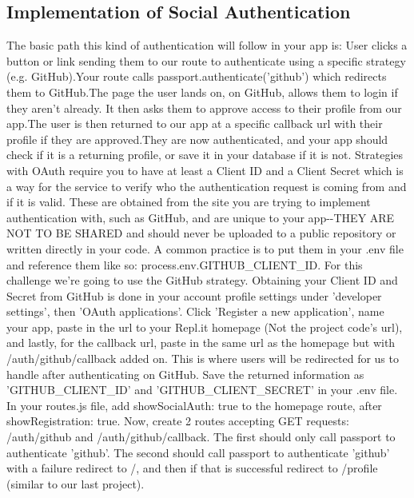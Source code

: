 \documentclass{article}%
\begin{document}
\subsection{Implementation of Social Authentication}%
\label{subsec:ImplementationofSocialAuthentication}%
The basic path this kind of authentication will follow in your app is: User clicks a button or link sending them to our route to authenticate using a specific strategy (e.g. GitHub).Your route calls passport.authenticate('github') which redirects them to GitHub.The page the user lands on, on GitHub, allows them to login if they aren't already. It then asks them to approve access to their profile from our app.The user is then returned to our app at a specific callback url with their profile if they are approved.They are now authenticated, and your app should check if it is a returning profile, or save it in your database if it is not.\newline%
Strategies with OAuth require you to have at least a Client ID and a Client Secret which is a way for the service to verify who the authentication request is coming from and if it is valid. These are obtained from the site you are trying to implement authentication with, such as GitHub, and are unique to your app{-}{-}THEY ARE NOT TO BE SHARED and should never be uploaded to a public repository or written directly in your code. A common practice is to put them in your .env file and reference them like so: process.env.GITHUB\_CLIENT\_ID. For this challenge we're going to use the GitHub strategy.\newline%
Obtaining your Client ID and Secret from GitHub is done in your account profile settings under 'developer settings', then 'OAuth applications'. Click 'Register a new application', name your app, paste in the url to your Repl.it homepage (Not the project code's url), and lastly, for the callback url, paste in the same url as the homepage but with /auth/github/callback added on. This is where users will be redirected for us to handle after authenticating on GitHub. Save the returned information as 'GITHUB\_CLIENT\_ID' and 'GITHUB\_CLIENT\_SECRET' in your .env file.\newline%
In your routes.js file, add showSocialAuth: true to the homepage route, after showRegistration: true. Now, create 2 routes accepting GET requests: /auth/github and /auth/github/callback. The first should only call passport to authenticate 'github'. The second should call passport to authenticate 'github' with a failure redirect to /, and then if that is successful redirect to /profile (similar to our last project).\newline%
\end{document}
